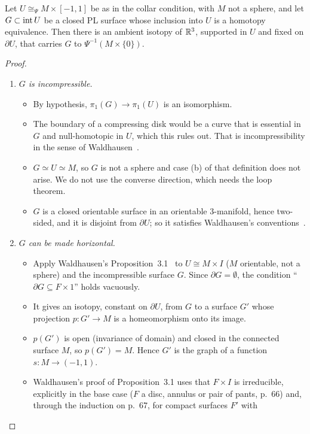 \begin{lemma}[Horizontality]\label{lem:horizontal}
Let $U\cong_{\Psi}M\times[-1,1]$ be as in the collar condition, with $M$ not a sphere, and let $G\subset\operatorname{int} U$
be a closed PL surface whose inclusion into $U$ is a homotopy equivalence. Then there is an ambient isotopy of
$\mathbb{R}^3$, supported in $U$ and fixed on $\partial U$, that carries $G$ to $\Psi^{-1}(M\times\{0\})$.
\end{lemma}
\begin{proof}
\begin{enumerate}
\item[(a)] \emph{$G$ is incompressible.}
  \begin{itemize}
  \item By hypothesis, $\pi_1(G)\to\pi_1(U)$ is an isomorphism.
  \item The boundary of a compressing disk would be a curve that is essential in $G$ and null-homotopic in $U$,
  which this rules out. That is incompressibility in the sense of Waldhausen~\cite[p.~58]{Waldhausen68}.
  \item $G\simeq U\simeq M$, so $G$ is not a sphere and case (b) of that definition does not arise. We do not use the
  converse direction, which needs the loop theorem.
  \item $G$ is a closed orientable surface in an orientable 3-manifold, hence two-sided, and it is disjoint from
  $\partial U$; so it satisfies Waldhausen's conventions~\cite[\S0]{Waldhausen68}.
  \end{itemize}
\item[(b)] \emph{$G$ can be made horizontal.}
  \begin{itemize}
  \item Apply Waldhausen's Proposition~3.1~\cite[pp.~65--68]{Waldhausen68} to $U\cong M\times I$ ($M$ orientable,
  not a sphere) and the incompressible surface $G$. Since $\partial G=\emptyset$, the condition
  ``$\partial G\subseteq F\times1$'' holds vacuously.
  \item It gives an isotopy, constant on $\partial U$, from $G$ to a surface $G'$ whose projection
  $p\colon G'\to M$ is a homeomorphism onto its image.
  \item $p(G')$ is open (invariance of domain) and closed in the connected surface $M$, so $p(G')=M$. Hence $G'$ is
  the graph of a function $s\colon M\to(-1,1)$.
  \item Waldhausen's proof of Proposition~3.1 uses that $F\times I$ is irreducible, explicitly in the base case
  ($F$ a disc, annulus or pair of pants, p.~66) and, through the induction on p.~67, for compact surfaces $F'$ with

\end{itemize}
\end{enumerate}
\end{proof}
